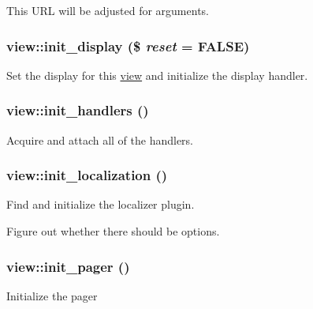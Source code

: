 This URL will be adjusted for arguments. \hypertarget{classview_a5d314e75f3ebe2c46988e9b0c6b9b3b4}{
\subsubsection[{init\_\-display}]{\setlength{\rightskip}{0pt plus 5cm}view::init\_\-display (\$ {\em reset} = {\ttfamily FALSE})}}
\label{classview_a5d314e75f3ebe2c46988e9b0c6b9b3b4}
Set the display for this \hyperlink{classview}{view} and initialize the display handler. \hypertarget{classview_a8f0b3dc5e14f0d96d37af0050b83ee6b}{
\subsubsection[{init\_\-handlers}]{\setlength{\rightskip}{0pt plus 5cm}view::init\_\-handlers ()}}
\label{classview_a8f0b3dc5e14f0d96d37af0050b83ee6b}
Acquire and attach all of the handlers. \hypertarget{classview_a6104b2107fa343423a9f2a6d678c394e}{
\subsubsection[{init\_\-localization}]{\setlength{\rightskip}{0pt plus 5cm}view::init\_\-localization ()}}
\label{classview_a6104b2107fa343423a9f2a6d678c394e}
Find and initialize the localizer plugin. 

Figure out whether there should be options.\hypertarget{classview_a32d1a24b94fcbb880b18ba8ae8dc709d}{
\subsubsection[{init\_\-pager}]{\setlength{\rightskip}{0pt plus 5cm}view::init\_\-pager ()}}
\label{classview_a32d1a24b94fcbb880b18ba8ae8dc709d}
Initialize the pager

